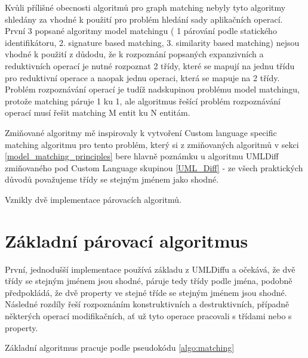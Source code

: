 \documentclass[11pt,twoside,a4paper]{book}
\begin{document}
 Kvůli přílišné obecnosti algoritmů pro graph matching nebyly tyto algoritmy
 shledány za vhodné k použití pro problém hledání sady aplikačních operací.
 První 3 popsané algoritmy model matchingu ( 1 párování podle statického
 identifikátoru, 2. signature based matching, 3.
 similarity based matching) nejsou vhodné k použití z důdodu, že k rozpoznání
 popsaných expanzivních a reduktivních operací je nutné rozpoznat 2 třídy,
 které se mapují na jednu třídu pro reduktivní operace a naopak jednu operaci,
 která se mapuje na 2 třídy. Problém rozpoznávání operací je tudíž nadskupinou
 problému model matchingu, protože matching páruje 1 ku 1, ale algoritmus řešící
 problém rozpoznávání operací musí řešit matching M entit
 ku N entitám.
 
 Zmiňované algoritmy mě inspirovaly k vytvoření Custom language specific
 matching algoritmu pro tento problém, který si z zmiňovaných algoritmů v
 sekci \ref{model_matching_principles} bere hlavně poznámku u algoritmu UMLDiff
 zmiňovaného pod Custom Language skupinou \ref{UML_Diff} - ze všech praktických důvodů
 považujeme třídy se stejným jménem jako shodné.

 Vznikly dvě implementace párovacích algoritmů. 
 
 \section{Základní párovací algoritmus}
 První, jednodušší implementace používá základu z UMLDiffu a očekává, že dvě
 třídy se stejným jménem jsou shodné, páruje tedy třídy podle jména, podobně
 předpokládá, že dvě property ve stejné tříde se stejným jménem jsou shodné.
 Následné rozdíly řeší rozpoznáním konstruktivních a destruktivních, případně
 některých operací modifikačních, ať už tyto operace pracovali s třídami nebo s
 property.
 
 Základní algoritmus pracuje podle pseudokódu \ref{algo:matching}
\end{document}
